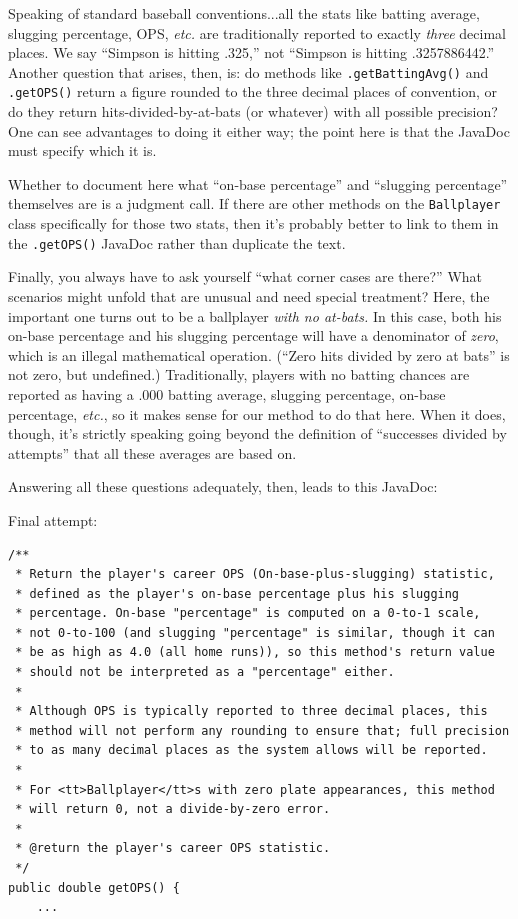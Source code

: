\label{batting average}
Speaking of standard baseball conventions...all the stats like batting
average, slugging percentage, OPS, \textit{etc.} are traditionally reported to
exactly \textit{three} decimal places. We say ``Simpson is hitting .325,'' not
``Simpson is hitting .3257886442.'' Another question that arises, then, is: do
methods like \texttt{.getBattingAvg()} and \texttt{.getOPS()} return a figure
rounded to the three decimal places of convention, or do they return
hits-divided-by-at-bats (or whatever) with all possible precision? One can see
advantages to doing it either way; the point here is that the JavaDoc must
specify which it is.

Whether to document here what ``on-base percentage'' and ``slugging percentage''
themselves are is a judgment call. If there are other methods on the
\texttt{Ballplayer} class specifically for those two stats, then it's probably
better to link to them in the \texttt{.getOPS()} JavaDoc rather than duplicate
the text.

\label{corner case}
Finally, you always have to ask yourself ``what corner cases are there?'' What
scenarios might unfold that are unusual and need special treatment? Here, the
important one turns out to be a ballplayer \textit{with no at-bats.} In this
case, both his on-base percentage and his slugging percentage will have a
denominator of \textit{zero}, which is an illegal mathematical operation.
(``Zero hits divided by zero at bats'' is not zero, but undefined.)
Traditionally, players with no batting chances are reported as having a .000
batting average, slugging percentage, on-base percentage, \textit{etc.}, so it
makes sense for our method to do that here. When it does, though, it's
strictly speaking going beyond the definition of ``successes divided by
attempts'' that all these averages are based on.

Answering all these questions adequately, then, leads to this JavaDoc:

Final attempt:
\vspace{-.15in}
\begin{Verbatim}[fontsize=\scriptsize,samepage=true,frame=single]
/**
 * Return the player's career OPS (On-base-plus-slugging) statistic,
 * defined as the player's on-base percentage plus his slugging 
 * percentage. On-base "percentage" is computed on a 0-to-1 scale,
 * not 0-to-100 (and slugging "percentage" is similar, though it can
 * be as high as 4.0 (all home runs)), so this method's return value
 * should not be interpreted as a "percentage" either.
 * 
 * Although OPS is typically reported to three decimal places, this
 * method will not perform any rounding to ensure that; full precision
 * to as many decimal places as the system allows will be reported.
 *
 * For <tt>Ballplayer</tt>s with zero plate appearances, this method
 * will return 0, not a divide-by-zero error.
 *
 * @return the player's career OPS statistic.
 */
public double getOPS() {
    ...
\end{Verbatim}

